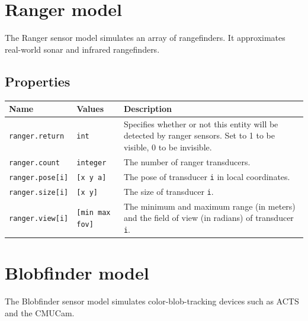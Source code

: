 \documentclass[letter,11pt,twoside]{report}
\begin{document}
\newpage
\section{Ranger model}

The Ranger sensor model simulates an array of rangefinders. It
approximates real-world sonar and infrared rangefinders.

\subsection*{Properties}
\begin{tabularx}{\columnwidth}{llX}
\hline
Name & Values & Description \\
\hline

\verb'ranger.return' & \verb'int' & Specifies whether or not this entity will be
detected by ranger sensors. Set to 1 to be visible, 0 to be invisible.\\

\verb'ranger.count' & \verb'integer' & The number of ranger
transducers.\\ 

\verb'ranger.pose[i]' & \verb'[x y a]' & The pose of transducer
\verb'i' in local coordinates.\\ 

\verb'ranger.size[i]' & \verb'[x y]' & The size of transducer \verb'i'.\\

\verb'ranger.view[i]' & \verb'[min max fov]' & The minimum and maximum
range (in meters) and the field of view (in radians) of transducer
\verb'i'.\\

\hline
\end{tabularx}


\newpage
\section{Blobfinder model}

The Blobfinder sensor model simulates color-blob-tracking devices such
as ACTS and the CMUCam.
\end{document}
